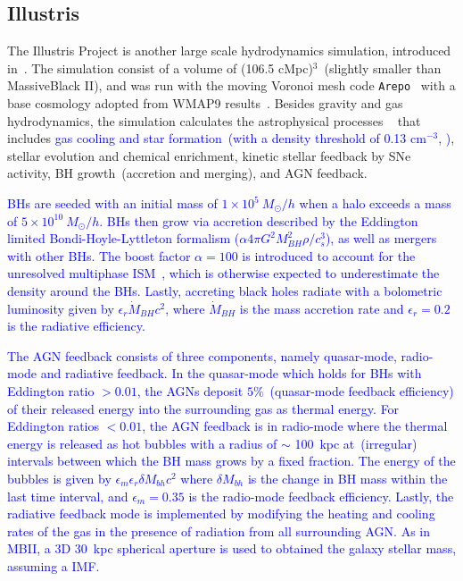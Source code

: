 \documentclass[twocolumn]{aastex631}
\newcommand{\blue}[1]{\textcolor{blue}{#1}}
\newcommand{\yo}[1]{\textcolor{purple}{[{\bf Yohan}: #1]}}
\newcommand{\aklant}[1]{\textcolor{blue}{#1}}
\begin{document}
\subsection{Illustris}
The Illustris Project is another large scale hydrodynamics simulation, introduced in~\citet{2014MNRAS.444.1518V, 2014Natur.509..177V}. The simulation consist of a volume of (106.5 cMpc)$^3$~(slightly smaller than MassiveBlack II), 
and was run with the moving Voronoi mesh code {\tt Arepo}~\citep{2010MNRAS.401..791S} with a base cosmology adopted from WMAP9 results~\citep{2013ApJS..208...19H}.
Besides gravity and gas hydrodynamics, the simulation calculates the astrophysical processes ~\citep{2013MNRAS.436.3031V, 2014MNRAS.438.1985T} that includes \aklant{gas cooling and star formation~(with a density threshold of 0.13 cm$^{-3}$, \citealt{2003MNRAS.339..289S})}, stellar evolution and chemical enrichment, kinetic stellar feedback by SNe activity, BH growth~(accretion and merging), and AGN feedback.

\aklant{BHs are seeded with an initial mass of $1 \times 10^5~M_{\odot}/h$ when a halo exceeds a mass of $5 \times 10^{10}~M_{\odot}/h$. BHs then grow via accretion described by the Eddington limited Bondi-Hoyle-Lyttleton formalism ($\alpha4\pi G^2M_{BH}^2 \rho/c_s^3$), as well as mergers with other BHs. The boost factor $\alpha=100$ is introduced to account for the unresolved multiphase ISM~\citep{Springel2005, 2009MNRAS.398...53B}, which is otherwise expected to underestimate the density around the BHs. Lastly, accreting black holes radiate with a bolometric luminosity given by $\epsilon_r \dot{M}_{BH}c^2$, where $\dot{M}_{BH}$ is the mass accretion rate and $\epsilon_r=0.2$ is the radiative efficiency.}

\aklant{The AGN feedback consists of three components, namely quasar-mode, radio-mode and radiative feedback. In the quasar-mode which holds for BHs with Eddington ratio $>0.01$, the AGNs deposit $5\%$~(quasar-mode feedback efficiency) of their released energy into the surrounding gas as thermal energy. For Eddington ratios $<0.01$, the AGN feedback is in radio-mode where the thermal energy is released as hot bubbles with a radius of $\sim$ 100~kpc at~(irregular) intervals between which the BH mass grows by a fixed fraction. The energy of the bubbles is given by $\epsilon_m \epsilon_r \delta M_{bh} c^2$ where $\delta M_{bh}$ is the change in BH mass within the last time interval, and $\epsilon_m=0.35$ is the radio-mode feedback efficiency. Lastly, the radiative feedback mode is implemented by modifying the heating and cooling rates of the gas in the presence of radiation from all surrounding AGN.} \blue{As in MBII, a 3D 30~kpc spherical aperture is used to obtained the galaxy stellar mass, assuming a \cite{2003PASP..115..763C} IMF.}
\end{document}
